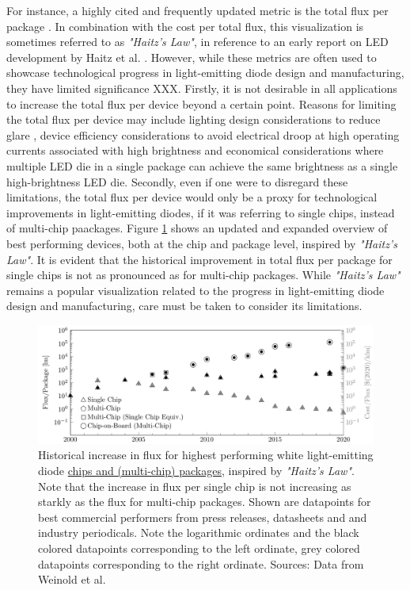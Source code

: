 \documentclass[a4paper,nocompress]{spie}  %
\begin{document}
For instance, a highly cited and frequently updated metric is the total flux per package \cite{Liu2009,haitz2011solid,cho2017white,Fontoynont2018}. In combination with the cost per total flux, this visualization is sometimes referred to as \textit{"Haitz's Law"}, in reference to an early report on LED development by Haitz et al. \cite{haitz1999case}. However, while these metrics are often used to showcase technological progress in light-emitting diode design and manufacturing, they have limited significance XXX. Firstly, it is not desirable in all applications to increase the total flux per device beyond a certain point. Reasons for limiting the total flux per device may include lighting design considerations to reduce glare \cite{khan2015led}, device efficiency considerations to avoid electrical droop at high operating currents associated with high brightness \cite{Piprek2010} and economical considerations where multiple LED die in a single package can achieve the same brightness as a single high-brightness LED die. Secondly, even if one were to disregard these limitations, the total flux per device would only be a proxy for technological improvements in light-emitting diodes, if it was referring to single chips, instead of multi-chip paackages. 
Figure \ref{fig:haitz} shows an updated and expanded overview of best performing devices, both at the chip and package level, inspired by \textit{"Haitz's Law"}. It is evident that the historical improvement in total flux per package for single chips is not as pronounced as for multi-chip packages. While \textit{"Haitz's Law"} remains a popular visualization related to the progress in light-emitting diode design and manufacturing, care must be taken to consider its limitations.

\begin{figure} [ht]
    \begin{center}
        \includegraphics[width=\textwidth]{haitz_law_white.pdf}
    \end{center}
    \caption{Historical increase in flux for highest performing white light-emitting diode \underline{chips and (multi-chip) packages}, inspired by \textit{"Haitz's Law"}. Note that the increase in flux per single chip is not increasing as starkly as the flux for multi-chip packages. Shown are datapoints for best commercial performers from press releases, datasheets and and industry periodicals. Note the logarithmic ordinates and the black colored datapoints corresponding to the left ordinate, grey colored datapoints corresponding to the right ordinate. Sources: Data from Weinold et al. \cite{weinold2020technology}}
    \label{fig:haitz}
\end{figure}
\end{document}
